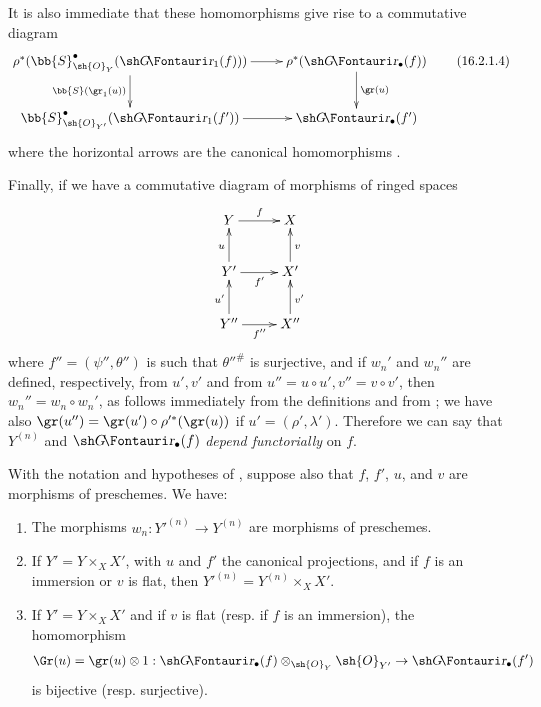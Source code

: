 \begin{env}[16.2.1]
It is also immediate that these homomorphisms give rise to a commutative diagram
\[
  \label{IV.16.2.1.4}
  \xymatrix{
    \rho^*(\bb{S}_{\sh{O}_Y}^\bullet(\shGr_1(f))) \ar[r] \ar[d]_-{\bb{S}(\gr_1(u))} & \rho^*(\shGr_\bullet(f)) \ar[d]^-{\gr(u)}\\
    \bb{S}_{\sh{O}_{Y'}}^\bullet(\shGr_1(f')) \ar[r] & \shGr_\bullet(f')
  }
  \tag{16.2.1.4}
\]
where the horizontal arrows are the canonical homomorphisms .

Finally, if we have a commutative diagram of morphisms of ringed spaces
\[
  \xymatrix{
    Y \ar[r]^{f} & X \\
    Y' \ar[r]_{f'} \ar[u]^u & X' \ar[u]_v\\
    Y'' \ar[r]_{f''} \ar[u]^{u'} & X'' \ar[u]_{v'}\\
  }
\]
where $f'' = (\psi'', \theta'')$ is such that $\theta''^\#$ is surjective, and if $w_n'$ and $w_n''$ are defined, respectively, from $u',v'$ and from $u''=u\circ u',v''=v\circ v'$, then $w_n''=w_n\circ w_n'$, as follows immediately from the definitions and from ;
we have also $\gr(u'') = \gr(u') \circ \rho'^*(\gr(u))$ if $u' = (\rho', \lambda')$.
Therefore we can say that $Y^{(n)}$ and $\shGr_\bullet(f)$ \emph{depend functorially} on $f$. 
\end{env}

\begin{proposition}[16.2.2]
\label{IV.16.2.2}
With the notation and hypotheses of , suppose also that $f$, $f'$, $u$, and $v$ are morphisms of preschemes. We have:
\begin{enumerate}
  \item[{\rm(i)}] The morphisms $w_n:Y'^{(n)} \to Y^{(n)}$ are morphisms of preschemes.
  \item[{\rm(ii)}] If $Y'=Y\times_X X'$, with $u$ and $f'$ the canonical projections, and if $f$ is an immersion or $v$ is flat, then $Y'^{(n)}=Y^{(n)}\times_X X'$.
  \item[{\rm(iii)}] If $Y' = Y \times_X X'$ and if $v$ is flat (resp. if $f$ is an immersion), the homomorphism 
  \[
    \Gr(u)=\gr(u)\otimes 1 : \shGr_\bullet(f)\otimes_{\sh{O}_Y}\sh{O}_{Y'} \to \shGr_\bullet(f')
  \]
  is bijective (resp. surjective).
\end{enumerate}
\end{proposition}

